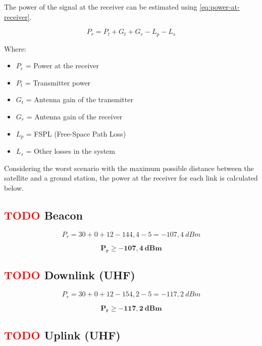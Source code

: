 The power of the signal at the receiver can be estimated using \autoref{eq:power-at-receiver}.

\begin{equation} \label{eq:power-at-receiver}
    P_{r} = P_{t} + G_{t} + G_{r} - L_{p} - L_{s}
\end{equation}

Where:

\begin{itemize}
    \item $P_{r}$ = Power at the receiver
    \item $P_{t}$ = Transmitter power
    \item $G_{t}$ = Antenna gain of the transmitter
    \item $G_{r}$ = Antenna gain of the receiver
    \item $L_{p}$ = FSPL (Free-Space Path Loss)
    \item $L_{s}$ = Other losses in the system
\end{itemize}

Considering the worst scenario with the maximum possible distance between the satellite and a ground station, the power at the receiver for each link is calculated below.

\subsection{ \textcolor{red}{TODO} Beacon}

\begin{equation}
    P_{r} = 30 + 0 + 12 - 144,4 - 5 = -107,4\ dBm
\end{equation}

\begin{equation}
    \mathbf{P_{r} \geq -107,4\ dBm}
\end{equation}

\subsection{ \textcolor{red}{TODO} Downlink (UHF)}

\begin{equation}
    P_{r} = 30 + 0 + 12 - 154,2 - 5 = -117,2\ dBm
\end{equation}

\begin{equation}
    \mathbf{P_{r} \geq -117,2\ dBm}
\end{equation}

\subsection{ \textcolor{red}{TODO} Uplink (UHF)}

